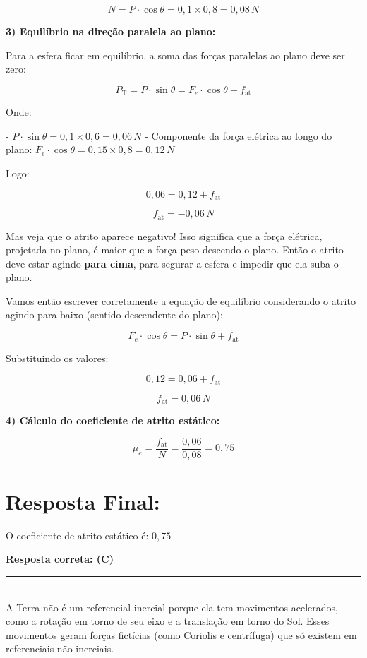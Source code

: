 \begin{flushleft}
\[
N = P \cdot \cos\theta = 0{,}1 \times 0{,}8 = 0{,}08\,N
\]

\textbf{3) Equilíbrio na direção paralela ao plano:}

Para a esfera ficar em equilíbrio, a soma das forças paralelas ao plano deve ser zero:

\[
P_{\text{T}} = P \cdot \sin\theta = F_e \cdot \cos\theta + f_{\text{at}}
\]

Onde:

- $P \cdot \sin\theta = 0{,}1 \times 0{,}6 = 0{,}06\,N$
- Componente da força elétrica ao longo do plano: $F_e \cdot \cos\theta = 0{,}15 \times 0{,}8 = 0{,}12\,N$

Logo:

\[
0{,}06 = 0{,}12 + f_{\text{at}}
\]

\[
f_{\text{at}} = -0{,}06\,N
\]

\colorbox{yellow!20}{Mas veja que o atrito aparece negativo!} Isso significa que a força elétrica, projetada no plano, é maior que 
a força peso descendo o plano. Então o atrito deve estar agindo \textbf{para cima}, para segurar a esfera e impedir que ela suba o plano.

Vamos então escrever corretamente a equação de equilíbrio considerando o atrito agindo para baixo (sentido descendente do plano):

\[
\boxed{
F_e \cdot \cos\theta = P \cdot \sin\theta + f_{\text{at}}
}
\]

Substituindo os valores:

\[
0{,}12 = 0{,}06 + f_{\text{at}}
\]

\[
f_{\text{at}} = 0{,}06\,N
\]

\textbf{4) Cálculo do coeficiente de atrito estático:}

\[
\mu_e = \frac{f_{\text{at}}}{N} = \frac{0{,}06}{0{,}08} = 0{,}75
\]

\section*{Resposta Final:}

O coeficiente de atrito estático é: $\boxed{0{,}75}$

\textbf{Resposta correta: \colorbox{green!50}{(C)}}

\end{flushleft}

\noindent\rule{\linewidth}{0.6pt}\\

\colorbox{yellow!30}{A Terra não é um referencial inercial porque ela tem movimentos acelerados}, como a rotação em torno de seu eixo 
e a translação em torno do Sol. Esses movimentos geram \colorbox{yellow!30}{forças fictícias (como Coriolis e centrífuga)} que só existem em referenciais não inerciais.

